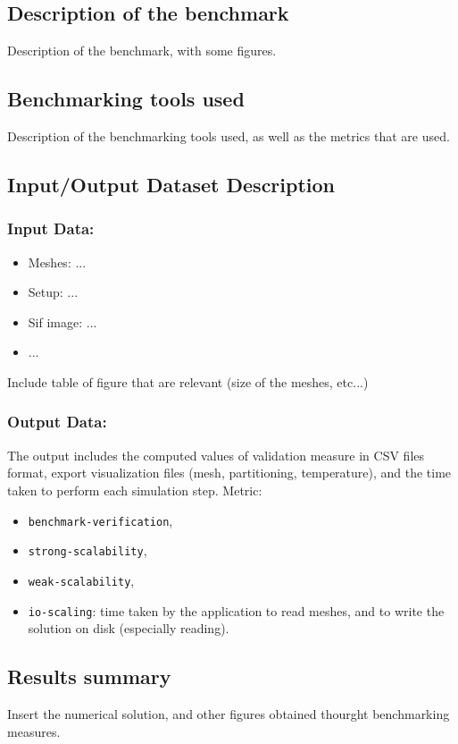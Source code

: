 

\subsection{Description of the benchmark}

Description of the benchmark, with some figures.




\subsection{Benchmarking tools used}

Description of the benchmarking tools used, as well as the metrics that are used.




\subsection{Input/Output Dataset Description}


\subsubsection{Input Data:}
  \begin{itemize}
  \item Meshes: ...
  \item Setup: ...
  \item Sif image: ...
  \item ...
  \end{itemize}

Include table of figure that are relevant (size of the meshes, etc...)

\subsubsection{Output Data:}

The output includes the computed values of validation measure in CSV files format, export visualization files (mesh, partitioning, temperature), and the time taken to perform each simulation step.
Metric:
\begin{itemize}
    \item \texttt{benchmark-verification},
    \item \texttt{strong-scalability},
    \item \texttt{weak-scalability},
    \item \texttt{io-scaling}: time taken by the application to read meshes, and to write the solution on disk (especially reading).
\end{itemize}





\subsection{Results summary}


Insert the numerical solution, and other figures obtained thourght benchmarking measures.
